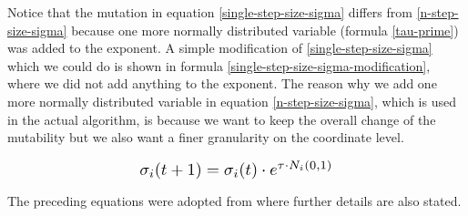 Notice that the mutation in equation \ref{single-step-size-sigma} differs from \ref{n-step-size-sigma} because one more normally distributed variable (formula \ref{tau-prime}) was added to the exponent. A simple modification of \ref{single-step-size-sigma} which we could do is shown in formula \ref{single-step-size-sigma-modification}, where we did not add anything to the exponent. The reason why we add one more normally distributed variable in equation \ref{n-step-size-sigma}, which is used in the actual algorithm, is because we want to keep the overall change of the mutability but we also want a finer granularity on the coordinate level.

\begin{equation}\label{single-step-size-sigma-modification}
\scalebox{1.3}{
    $\sigma_i(t+1) = \sigma_i(t) \cdot e^{\tau \cdot N_i(0,1)}$
}
\end{equation}

The preceding equations were adopted from \cite{natural-computing-algorithms, introduction-to-evolutionary-computing} where further details are also stated.